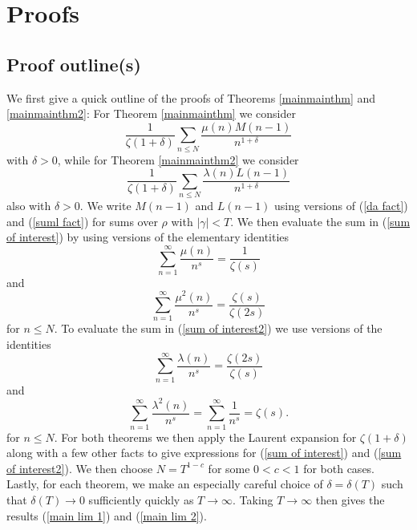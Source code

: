 \documentclass[11pt,article]{amsart}
\numberwithin{equation}{section}
\numberwithin{equation}{section}
\numberwithin{lemma}{section}
\numberwithin{prop}{section}
\begin{document}

\section{Proofs}

\subsection{Proof outline(s)}
We first give a quick outline of the proofs of Theorems \ref{mainmainthm} and \ref{mainmainthm2}: For Theorem \ref{mainmainthm} we consider 
\begin{equation}
\frac{1}{\zeta(1+\delta)}\sum_{n\leq N}\frac{\mu(n)M(n-1)}{n^{1+\delta}} \label{sum of interest}
\end{equation}
with $\delta>0$, while for Theorem \ref{mainmainthm2} we consider 
\begin{equation}
\frac{1}{\zeta(1+\delta)}\sum_{n\leq N}\frac{\lambda(n)L(n-1)}{n^{1+\delta}} \label{sum of interest2}
\end{equation}
also with $\delta>0$. We write $M(n-1)$ and $L(n-1)$ using versions of (\ref{da fact}) and (\ref{suml fact}) for sums over $\rho$ with $\left|\gamma\right|<T$. We then evaluate the sum in (\ref{sum of interest}) by using versions of the elementary identities 
\begin{equation}
\sum_{n=1}^{\infty}\frac{\mu(n)}{n^{s}}=\frac{1}{\zeta(s)} \label{elem}
\end{equation}
and
\begin{equation}
\sum_{n=1}^{\infty}\frac{\mu^{2}(n)}{n^{s}}=\frac{\zeta(s)}{\zeta(2s)} \label{dlmf gen}
\end{equation}
for $n\leq N$. To evaluate the sum in (\ref{sum of interest2}) we use versions of the identities 
\begin{equation}
\sum_{n=1}^{\infty}\frac{\lambda(n)}{n^{s}}=\frac{\zeta(2s)}{\zeta(s)} \label{elem2}
\end{equation}
and
\begin{equation}
\sum_{n=1}^{\infty}\frac{\lambda^{2}(n)}{n^{s}}=\sum_{n=1}^{\infty}\frac{1}{n^{s}}=\zeta(s). \label{dlmf gen2}
\end{equation}
for $n\leq N$. For both theorems we then apply the Laurent expansion for $\zeta(1+\delta)$ along with a few other facts to give expressions for (\ref{sum of interest}) and (\ref{sum of interest2}). We then choose $N=T^{1-c}$ for some $0<c<1$ for both cases. Lastly, for each theorem, we make an especially careful choice of $\delta=\delta(T)$ such that $\delta(T) \rightarrow 0$ sufficiently quickly as $T\rightarrow \infty$. Taking $T\rightarrow \infty$ then gives the results  (\ref{main lim 1}) and (\ref{main lim 2}). 
\end{document}

